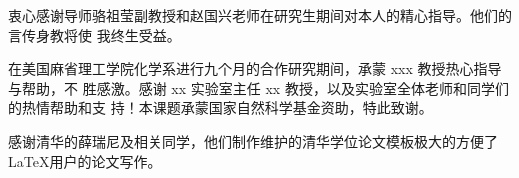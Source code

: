 
\begin{ack}
  衷心感谢导师骆祖莹副教授和赵国兴老师在研究生期间对本人的精心指导。他们的言传身教将使
  我终生受益。

  在美国麻省理工学院化学系进行九个月的合作研究期间，承蒙 xxx 教授热心指导与帮助，不
  胜感激。感谢 xx 实验室主任 xx 教授，以及实验室全体老师和同学们的热情帮助和支
  持！本课题承蒙国家自然科学基金资助，特此致谢。

  感谢清华的薛瑞尼及相关同学，他们制作维护的清华学位论文模板极大的方便了\LaTeX{}用户的论文写作。

\end{ack}
